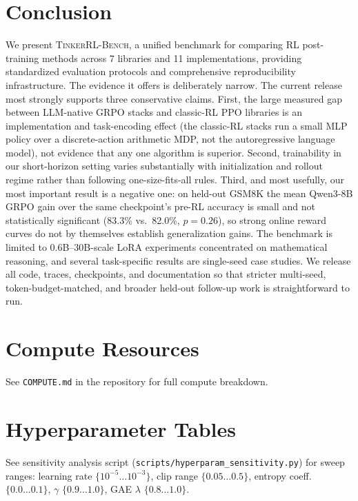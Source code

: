\documentclass[manuscript,review,anonymous]{acmart}
\newcommand{\ours}{\textsc{TinkerRL-Bench}}
\begin{document}
\section{Conclusion}
\label{sec:conclusion}


We present \ours{}, a unified benchmark for comparing RL post-training methods
across 7 libraries and 11 implementations, providing standardized evaluation
protocols and comprehensive reproducibility infrastructure. The evidence it
offers is deliberately narrow. The current release most strongly supports
three conservative claims. First, the large measured gap between LLM-native
GRPO stacks and classic-RL PPO libraries is an implementation and
task-encoding effect (the classic-RL stacks run a small MLP policy over a
discrete-action arithmetic MDP, not the autoregressive language model), not
evidence that any one algorithm is superior. Second, trainability in our
short-horizon setting varies substantially with initialization and rollout
regime rather than following one-size-fits-all rules. Third, and most
usefully, our most important result is a negative one: on held-out GSM8K the
mean Qwen3-8B GRPO gain over the same checkpoint's pre-RL accuracy is small and
not statistically significant (83.3\% vs.\ 82.0\%, $p{=}0.26$), so strong
online reward curves do not by themselves establish generalization gains. The
benchmark is limited to 0.6B--30B-scale LoRA experiments concentrated on
mathematical reasoning, and several task-specific results are single-seed case
studies. We release all code, traces, checkpoints, and documentation so that
stricter multi-seed, token-budget-matched, and broader held-out follow-up work
is straightforward to run.




\appendix


\section{Compute Resources}
\label{app:compute}

See \texttt{COMPUTE.md} in the repository for full compute breakdown.

\section{Hyperparameter Tables}
\label{app:hyperparams}

See sensitivity analysis script (\texttt{scripts/hyperparam\_sensitivity.py})
for sweep ranges: learning rate $\{10^{-5}\ldots10^{-3}\}$,
clip range $\{0.05\ldots0.5\}$, entropy coeff. $\{0.0\ldots0.1\}$,
$\gamma$ $\{0.9\ldots1.0\}$, GAE $\lambda$ $\{0.8\ldots1.0\}$.
\end{document}
